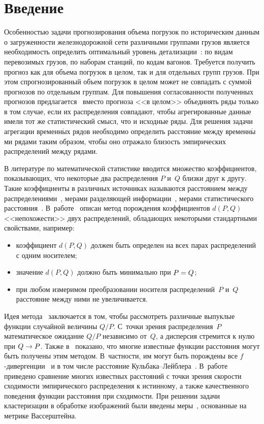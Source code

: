       \begin{multicols}{2}

            \label{st\stat}


\section{Введение}
Особенностью задачи прогнозирования объема погрузок по историческим данным о
загружен\-ности железнодорожной сети различными группами грузов является
необходимость определить оптимальный уровень
детализации~\cite{Medvednikova2012, Motrenko2013}: по видам перевозимых грузов,
по наборам станций, по кодам вагонов. Требуется получить прогноз как для объема
погрузок в целом, так и для отдельных групп грузов. При этом спрогнозированный
объем погрузок в целом может не совпадать с суммой прогнозов по отдельным группам.
Для повышения согласованности полученных прогнозов
предлагается~\cite{Medvdnikova2014} вместо прогноза <<в целом>> объединять ряды
только в том случае, если их распределения совпадают, чтобы агрегированные данные
имели тот же статистический смысл, что и исходные ряды. Для решения задачи
агрегации временн$\acute{\mbox{ы}}$х рядов необходимо определить расстояние между
временн$\acute{\mbox{ы}}$ми рядами
таким образом, чтобы оно отражало близость эмпирических распределений между рядами.

В литературе по математической статистике вводится множество коэффициентов,
показывающих, что некоторые два распределения $P$ и~$Q$ близки друг к другу.
Такие коэффициенты в различных источниках называются расстоянием между
распределениями~\cite{Kullback1959}, мерами разделяющей
информации~\cite{Chernoff1952}, мерами статистического
расстояния~\cite{Kolmogorov1965}. В~работе~\cite{AliSilvey1966} описан метод
порождения коэффициентов $d(P, Q)$ <<непохожести>> двух распределений, обладающих
некоторыми стандартными свойствами, например:
\begin{itemize}
\item коэффициент $d(P, Q)$ должен быть определен на всех парах распределений
с одним носителем;
\item значение $d(P, Q)$ должно быть минимально при $P \hm= Q$;
\item при любом измеримом преобразовании носителя распределений~$P$ и~$Q$
расстояние между ними не увеличивается.
\end{itemize}
Идея метода~\cite{AliSilvey1966} заключается в том, чтобы рас\-смот\-реть
различные выпуклые функции случайной величины $Q/P$.
С~точки зрения распределения~$P$ математическое ожидание $Q/P$ независимо от~$Q$, а
дисперсия стремится к нулю при $Q \hm\to P$. Также в~\cite{AliSilvey1966}
показано, что многие известные функции расстояния могут быть получены этим методом.
В~частности, им могут быть порождены все $f$-ди\-вер\-ген\-ции~\cite{scizar2004} и
в том числе расстояние Куль\-ба\-ка--Лейб\-ле\-ра~\cite{Kullback1959}.
В~работе~\cite{Gibs} приведено сравнение многих известных расстояний с
точки зрения скорости схо\-ди\-мости эмпирического распределения к истинному,
а также качественного поведения функции рас\-сто\-яния при сходимости. При решении
задачи кластеризации в обработке изображений были введены меры~\cite{Mallows1972, Irpino}, основанные
на метрике Вассерштейна.


\end{multicols}
